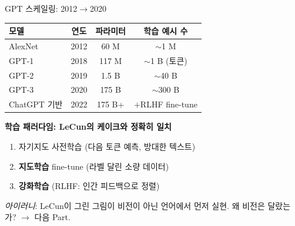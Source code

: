 \documentclass[aspectratio=169,10pt]{beamer}
\begin{document}
\begin{frame}{GPT 스케일링: 2012$\to$2020}
\begin{center}
\begin{tabular}{lccc}
\toprule
모델 & 연도 & 파라미터 & 학습 예시 수 \\
\midrule
AlexNet & 2012 & 60 M & $\sim$1 M \\
GPT-1 & 2018 & 117 M & $\sim$1 B (토큰) \\
GPT-2 & 2019 & 1.5 B & $\sim$40 B \\
GPT-3 & 2020 & 175 B & $\sim$300 B \\
ChatGPT 기반 & 2022 & 175 B+ & $+$RLHF fine-tune \\
\bottomrule
\end{tabular}
\end{center}

\vspace{0.5em}
\textbf{학습 패러다임: LeCun의 케이크와 정확히 일치}
\begin{enumerate}
  \item \alert{자기지도 사전학습} (다음 토큰 예측, 방대한 텍스트)
  \item \textbf{지도학습} fine-tune (라벨 달린 소량 데이터)
  \item \textbf{강화학습} (RLHF: 인간 피드백으로 정렬)
\end{enumerate}

\vspace{0.3em}
\footnotesize
\textit{아이러니}: LeCun이 그린 그림이 \alert{비전이 아닌 언어에서} 먼저 실현.
왜 비전은 달랐는가? $\to$ 다음 Part.
\end{frame}
\end{document}
